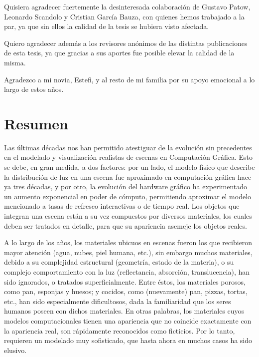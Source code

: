 \documentclass[spanish,a4paper,oneside,10pt,openright]{book}
\begin{document}
Quisiera agradecer fuertemente la desinteresada colaboración de Gustavo Patow, Leonardo Scandolo y Cristian García Bauza, con quienes hemos trabajado a la par, ya que sin ellos la calidad de la tesis se hubiera visto afectada.

Quiero agradecer además a los revisores anónimos de las distintas publicaciones de esta tesis, ya que gracias a sus aportes fue posible elevar la calidad de la misma.

Agradezco a mi novia, Estefi, y al resto de mi familia por su apoyo emocional a lo largo de estos años.

\phantom{p. 1}
\clearpage
\thispagestyle{empty}
\phantom{p. 2}
\clearpage

\chapter*{Resumen} %

Las últimas décadas nos han permitido atestiguar de la evolución sin precedentes en el modelado y visualización realistas de escenas en Computación Gráfica.
Esto se debe, en gran medida, a dos factores: por un lado, el modelo físico que describe la distribución de luz en una escena fue aproximado en computación gráfica hace ya tres décadas, y por otro, la evolución del hardware gráfico ha experimentado un aumento exponencial en poder de cómputo, permitiendo aproximar el modelo mencionado a tasas de refresco interactivas o de tiempo real.
Los objetos que integran una escena están a su vez compuestos por diversos materiales, los cuales deben ser tratados en detalle, para que su apariencia asemeje los objetos reales.

A lo largo de los años, los materiales ubicuos en escenas fueron los que recibieron mayor atención (agua, nubes, piel humana, etc.), sin embargo muchos materiales, debido a su complejidad estructural (geometría, estado de la materia), o su complejo comportamiento con la luz (reflectancia, absorción, translucencia), han sido ignorados, o tratados superficialmente.
Entre éstos, los materiales porosos, como pan, esponjas y huesos; y cocidos, como (nuevamente) pan, pizzas, tortas, etc., han sido especialmente dificultosos, dada la familiaridad que los seres humanos poseen con dichos materiales.
En otras palabras, los materiales cuyos modelos computacionales tienen una apariencia que no coincide exactamente con la apariencia real, son rápidamente reconocidos como ficticios. Por lo tanto, requieren un modelado muy sofisticado, que hasta ahora en muchos casos ha sido elusivo.
\end{document}
